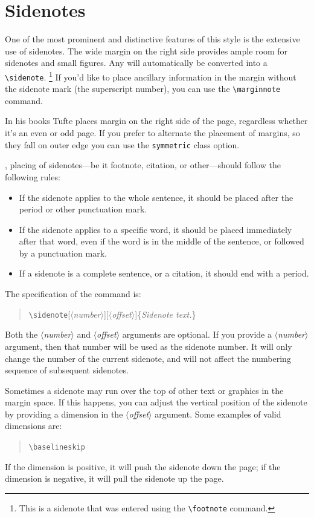 \documentclass[a4paper]{tufte-handout}
\newcommand{\hlorange}[1]{\textcolor{tufte-orange}{#1}}
\newcommand{\doccmd}[1]{\hlorange{\texttt{\textbackslash#1}}}
\newcommand{\docopt}[1]{\( \langle \)\textrm{\textit{#1}}\( \rangle \)}
\newcommand{\docarg}[1]{\textrm{\textit{#1}}}
\newcommand{\docclsopt}[1]{\hlorange{\texttt{#1}}}
\newenvironment{docspec}
  {\begin{quotation}\ttfamily\parskip0pt\parindent0pt\ignorespaces}
  {\end{quotation}}
\begin{document}
\section{Sidenotes}\label{sec:sidenotes}
One of the most prominent and distinctive features of this style is the extensive use of sidenotes.
The wide margin on the right side provides ample room for sidenotes and small figures.
Any  will automatically be converted into a \doccmd{sidenote}.%
\footnote{This is a sidenote that was entered using the \doccmd{footnote} command.}
If you'd like to place ancillary information in the margin without the sidenote mark (the superscript
number), you can use the \doccmd{marginnote} command.

In his books Tufte places margin on the right side of the page, regardless whether it's an even or odd page.
If you prefer to alternate the placement of margins, so they fall on outer edge you can use the \docclsopt{symmetric} class option.

, placing of sidenotes---be it footnote, citation, or other---should follow the following rules:
\begin{itemize}
  \item If the sidenote applies to the whole sentence, it should be placed after the period or other punctuation mark.
  \item If the sidenote applies to a specific word, it should be placed immediately after that word, even if the word is in the middle of the sentence, or followed by a punctuation mark.
  \item If a sidenote is a complete sentence, or a citation, it should end with a period.
\end{itemize}
The specification of the  command is:
\begin{docspec}
  \doccmd{sidenote}[\docopt{number}][\docopt{offset}]\{\docarg{Sidenote text.}\}
\end{docspec}

Both the \docopt{number} and \docopt{offset} arguments are optional.
If you provide a \docopt{number} argument, then that number will be used as the sidenote number.
It will only change the number of the current sidenote, and will not affect the numbering sequence of subsequent sidenotes.

Sometimes a sidenote may run over the top of other text or graphics in the margin space.
If this happens, you can adjust the vertical position of the sidenote by providing a dimension in the \docopt{offset} argument.
Some examples of valid dimensions are:
\begin{docspec}
  \ttfamily 1.0in \qquad 2.54cm \qquad 254mm \Verb|\baselineskip|
\end{docspec}
If the dimension is positive, it will push the sidenote down the page; if the dimension is negative, it will pull the sidenote up the page.
\end{document}
